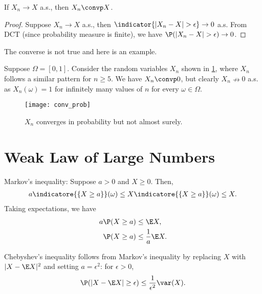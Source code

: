 \documentclass[../aipt.tex]{subfiles}
\begin{document}
\begin{Lemma}\label{wk5:Lem:Convergence in probability}
If $X_n \to X$ a.s., then $X_n \convp X$.
\end{Lemma}
\begin{proof}
Suppose $X_n \to X$ a.s., then $\indicator{|X_n-X|> \epsilon} \to 0$ a.s. From DCT (since probability measure is finite), we have $\P(|X_n-X|> \epsilon)\to 0$.
\end{proof}

The converse is not true and here is an example.

\begin{Example}
Suppose $\Omega=[0,1]$. Consider the random variables $X_n$ shown in \cref{wk5:fg:Counter Example}, where $X_n$ follows a similar pattern for $n\geq 5$. We have $X_n \convp 0$, but clearly $X_n \nrightarrow 0$ a.s. as $X_n(\omega) = 1$ for infinitely many values of $n$ for every $\omega\in\Omega$.

\begin{figure}[!htb]
\centering
\texttt{[image: conv\_prob]} 
\caption{$X_n$ converges in probability but not almost surely.} 
\label{wk5:fg:Counter Example}
\end{figure}
\end{Example}

\section{Weak Law of Large Numbers}

Markov’s inequality: Suppose $a>0$ and $X\geq 0$. Then, 
\begin{align*}
a \indicatore{\{X\geq a\}}(\omega) \leq X\indicatore{\{X\geq a\}}(\omega)\leq X.
\end{align*}
Taking expectations, we have
\begin{align*}
a\P(X\geq a) & \leq \E X,\\
\P(X\geq a) & \leq \frac{1}{a}\E X.
\end{align*}

Chebyshev's inequality follows from Markov's inequality by replacing $X$ with $|X- \E X|^2$ and setting $a=\epsilon^2$: for $\epsilon>0$, 
\begin{align*}
\P( |X- \E X | \geq \epsilon) \leq \frac{1}{\epsilon ^2} \var(X).
\end{align*}
\end{document}
